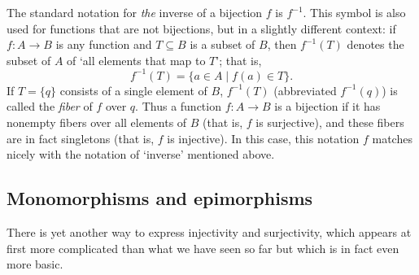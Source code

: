 The standard notation for \emph{the} inverse of a bijection $f$ is
$f^{-1}$. This symbol is also used for functions that are not
bijections, but in a slightly different context: if $f : A \to B$ is
any function and $T \subseteq B$ is a subset of $B$, then $f^{-1} (T)$
denotes the subset of $A$ of `all elements that map to $T$'; that is,
\[f^{-1}(T) = \{a \in A \mid f (a) \in T \}.\] If $T = \{q\}$ consists
of a single element of $B$, $f^{-1}(T)$ (abbreviated $f^{-1}(q)$) is
called the \emph{fiber} of $f$ over $q$. Thus a function $f : A \to B$
is a bijection if it has nonempty fibers over all elements of $B$
(that is, $f$ is surjective), and these fibers are in fact singletons
(that is, $f$ is injective). In this case, this notation $f$ matches
nicely with the notation of `inverse' mentioned above.

\subsection{Monomorphisms and epimorphisms}%
\label{subsec:prelims:functions:monomorphisms-and-epimorphisms}
There is yet another way to express injectivity and surjectivity,
which appears at first more complicated than what we have seen so far
but which is in fact even more basic.


